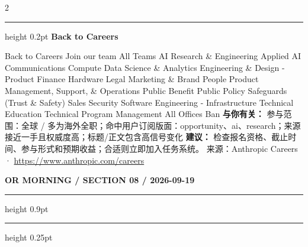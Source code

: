 \documentclass[10.5pt]{ctexart}
\begin{document}
\begin{multicols}{2}
\vspace{2mm}
\hrule height 0.2pt
\vspace{2mm}
{\large\bfseries Back to Careers}\par
Back to Careers Join our team All Teams AI Research \& Engineering Applied AI Communications Compute Data Science \& Analytics Engineering \& Design - Product Finance Hardware Legal Marketing \& Brand People Product Management, Support, \& Operations Public Benefit Public Policy Safeguards (Trust \& Safety) Sales Security Software Engineering - Infrastructure Technical Education Technical Program Management All Offices Ban
\textbf{与你有关：} 参与范围：全球 / 多为海外全职；命中用户订阅版面：opportunity、ai、research；来源接近一手且权威度高；标题/正文包含高信号变化
\textbf{建议：} 检查报名资格、截止时间、参与形式和预期收益；合适则立即加入任务系统。
{\footnotesize\color{ormuted} 来源：Anthropic Careers · \url{https://www.anthropic.com/careers}}
\end{multicols}
\newpage
{\small\bfseries OR MORNING / SECTION 08 / 2026-09-19}
\vspace{2mm}
\hrule height 0.9pt
\vspace{1.5mm}
\hrule height 0.25pt
\vspace{4mm}
\end{document}
